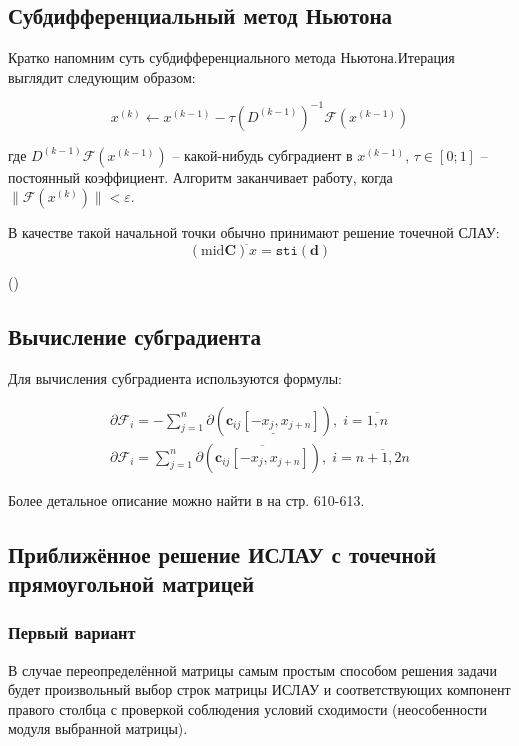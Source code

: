 \subsection{Субдифференциальный метод Ньютона}

Кратко напомним суть субдифференциального метода Ньютона.Итерация выглядит следующим образом:

\begin{equation*}
	x^{(k)} \leftarrow x^{(k - 1)} - \tau(D^{(k - 1)})^{-1}\mathcal{F}(x^{(k - 1)})
\end{equation*}

где $D^{(k - 1)}\mathcal{F}(x^{(k - 1)})$ -- какой-нибудь субградиент в $x^{(k - 1)}$, $\tau \in [0; 1]$ -- постоянный коэффициент. Алгоритм заканчивает работу, когда $\| \mathcal{F}(x^{(k)}) \| < \varepsilon$.

В качестве такой начальной точки обычно принимают решение точечной СЛАУ:
\begin{equation}
(\textrm{mid} \mathbf{C})^{\tilde{}}x = \texttt{sti}(\mathbf{d})
\end{equation}

 (\cite[стр. 607]{shary})

\subsection{Вычисление субградиента}

Для вычисления субградиента используются формулы:

\begin{align}
\partial\mathcal{F}_i=-\sum_{j=1}^{n}\partial(\underline{\mathbf{c}_{ij}[-x_j, x_{j+n}]}), \;i = \overline{1,n} \\
\partial\mathcal{F}_i=\sum_{j=1}^{n}\partial(\overline{\mathbf{c}_{ij}[-x_j, x_{j+n}]}), \;i = \overline{n+1,2n}
\end{align}

Более детальное описание можно найти в \cite{shary} на стр. 610-613.

\subsection{Приближённое решение ИСЛАУ с точечной прямоугольной матрицей }

\subsubsection{Первый вариант}

В случае переопределённой матрицы самым простым способом решения задачи будет произвольный выбор строк матрицы ИСЛАУ и соответствующих компонент правого столбца с проверкой соблюдения условий сходимости (неособенности модуля выбранной матрицы).

